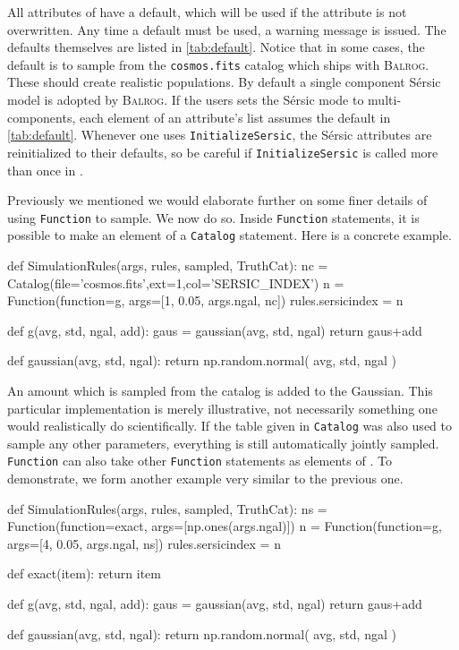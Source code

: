 \documentclass[11pt]{book}
\newcommand{\codett}[1]{\lstinline{#1}}
\newcommand{\balrog}{\textsc{Balrog}}
\newcommand{\sersic}{S\'{e}rsic}
\begin{document}
All attributes of \simrules{} have a default, which will be used if the attribute is not overwritten.
Any time a default must be used, a warning message is issued.
The defaults themselves are listed in \autoref{tab:default}.
Notice that in some cases, the default is to sample from the \codett{cosmos.fits} catalog which
ships with \balrog{}.
These should create realistic populations.
By default a single component \sersic{} model is adopted by \balrog{}.
If the users sets the \sersic{} mode to multi-components, each element of an attribute's list assumes the default in \autoref{tab:default}.
Whenever one uses \codett{InitializeSersic}, the \sersic{} attributes 
are reinitialized to their defaults, so be careful if \codett{InitializeSersic} is called more than once
in \simfunc{}.



Previously we mentioned we would elaborate further on some finer details of using \codett{Function} to sample.
We now do so.
Inside \codett{Function} statements, it is possible to make an element of \simargs{} a \codett{Catalog} statement.
Here is a concrete example.

\begin{code}
def SimulationRules(args, rules, sampled, TruthCat):
    nc = Catalog(file='cosmos.fits',ext=1,col='SERSIC_INDEX')
    n = Function(function=g, args=[1, 0.05, args.ngal, nc])
    rules.sersicindex = n

def g(avg, std, ngal, add):
    gaus = gaussian(avg, std, ngal)
    return gaus+add

def gaussian(avg, std, ngal):
    return np.random.normal( avg, std, ngal )
\end{code}

\noindent An amount which is sampled from the catalog is added to the Gaussian.
This particular implementation is merely illustrative, not necessarily
something one would realistically do scientifically.
If the table given in \codett{Catalog} was also used to sample any other parameters,
everything is still automatically jointly sampled.
\codett{Function} can also take other \codett{Function} statements as elements of \simargs{}.
To demonstrate, we form another example very similar to the previous one.

\begin{code}
def SimulationRules(args, rules, sampled, TruthCat):
    ns = Function(function=exact, args=[np.ones(args.ngal)])
    n = Function(function=g, args=[4, 0.05, args.ngal, ns])
    rules.sersicindex = n

def exact(item):
    return item

def g(avg, std, ngal, add):
    gaus = gaussian(avg, std, ngal)
    return gaus+add

def gaussian(avg, std, ngal):
    return np.random.normal( avg, std, ngal )
\end{code}
\end{document}
